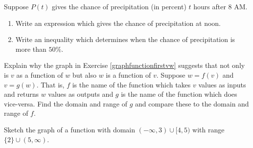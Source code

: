 \documentclass{ximera}
\begin{document}
\begin{problem}
Suppose $P(t)$ gives the chance of precipitation (in percent)  $t$ hours after 8 AM.

\begin{enumerate}

\item  Write an expression which gives the chance of precipitation at noon.

\item  Write an inequality which determines when the chance of precipitation is more than $50 \%$.

\end{enumerate}
\end{problem}

\begin{problem}
Explain why the graph in  Exercise \ref{graphfunctionfirstvw}  suggests that not only is $v$ as a function of $w$ but also $w$ is a function of $v$.  Suppose $w = f(v)$ and $v = g(w)$.  That is, $f$ is the name of the function which takes $v$ values as inputs and returns $w$ values as outputs and $g$ is the name of the function which does vice-versa.   Find the domain and range of  $g$ and compare these to the domain and range of $f$.
\end{problem}

\begin{problem}
Sketch the graph of a function with domain $(-\infty, 3) \cup [4,5)$ with range $\{ 2 \} \cup (5, \infty)$.
\end{problem}

  
\end{document}
